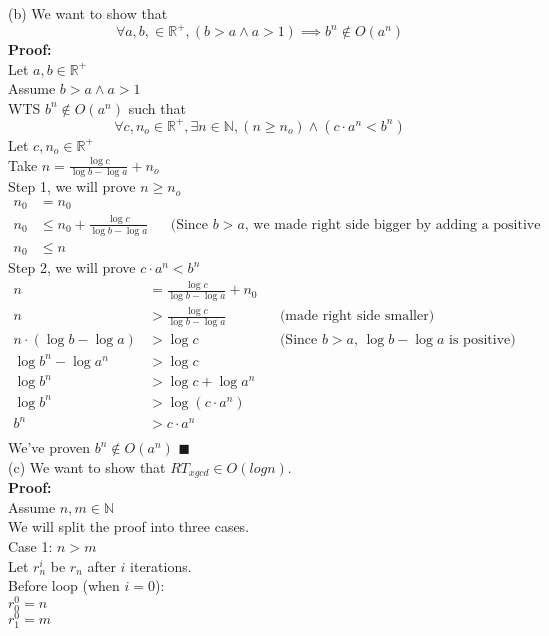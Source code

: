 \documentclass{article}
\newcommand{\R}{\mathbb{R}}
\newcommand{\N}{\mathbb{N}}
\begin{document}
\begin{enumerate}
	(b) We want to show that $$ \forall a, b, \in \R^+, (b > a \wedge a > 1) \implies b^n \notin O(a^n)$$
	 \textbf{Proof:} \\
	 Let $a, b \in \R^+$\\
	 Assume $b > a \wedge a > 1$\\
	 WTS $b^n \notin O(a^n)$ such that $$\forall c, n_o \in \R^+, \exists n \in \N, (n \geq n_o) \wedge (c \cdot a^n < b^n)$$
	 Let $c, n_o \in \R^+$\\
	 Take $n = \frac{\log c}{\log b -\log a} + n_o$\\
	 Step 1, we will prove $n \geq n_o$
	 \begin{align*}
	 n_0 &= n_0\\
	 n_0 &\leq n_0 +  \frac{\log c}{\log b -\log a} && \text{(Since  $b > a$, we made right side bigger by adding a positive fraction)}\\
	 n_0 &\leq n
	\end{align*}
	Step 2, we will prove $c \cdot a^n < b^n$
	 \begin{align*}
	 n &= \frac{\log c}{\log b -\log a} + n_0\\
	 n &> \frac{\log c}{\log b -\log a} && \text{(made right side smaller)}\\
	 n \cdot (\log b -\log a) &> \log c && \text{(Since $b > a$, $\log b -\log a$ is positive)}\\
	 \log b^n -\log a^n &> \log c\\
	 \log b^n &> \log c + \log a^n \\
	 \log b^n &> \log(c \cdot a^n) \\
	 b^n &> c \cdot a^n \\
	\end{align*}
	We've proven $b^n \notin O(a^n)$ \null\hfill $\blacksquare$\\
	
	(c)  We want to show that $RT_{xgcd} \in O(log n)$.\\
	 \textbf{Proof:} \\
	 Assume $n, m \in \N$\\
	 We will split the proof into three cases.\\
	 
	 Case 1: $n > m$\\
	 Let $r_n^i$ be $r_n$ after $i$ iterations.\\
	 
	 Before loop (when $i = 0$):\\
	 $r_0^0 = n$\\
	 $r_1^0 = m$\\
	 

\end{enumerate}
\end{document}
